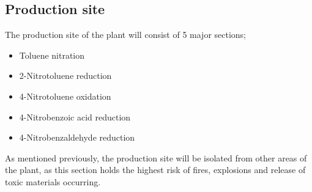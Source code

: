 \begin{comment}
Road traffic should not go through process areas except to destination. There should be loading and unloading areas with adequate parking. 

Emergency arrangements - emergency control centre. Assembley points designated in safe areas at least 100 metres from the plant. A control rooom not used as emergency centre room or refuge room. 
Road access to all points in the site. 
Safeguard utilities like electricity.

Security - boundary fence around the site and all entrances should have a gatehouse. The number of entrances should be minimised. 

No workplace should be more than 45 m from an exit. 

A wind of at least 8km/h needed needed to disperse toxic vapours safely.

Fire fighting access with plot size 100 x 200 m and spacing between plot and buildings of 15 m. 

A minimum of two escape routes for any workspace. No work place should be more than 12 to 45 m from an exit and dead end should not exceed 8 m. Doors on escape room should be hinged or sliding type and the hinged should open in the direction of escape. Should be at least 0.7m wide (preferably 1.2m). 
\end{comment}




\subsection{Production site}

The production site of the plant will consist of 5 major sections; 

\begin{itemize}
    \item Toluene nitration
    \item 2-Nitrotoluene reduction 
    \item 4-Nitrotoluene oxidation 
    \item 4-Nitrobenzoic acid reduction 
    \item 4-Nitrobenzaldehyde reduction 
\end{itemize}

As mentioned previously, the production site will be isolated from other areas of the plant, as this section holds the highest risk of fires, explosions  and release of toxic materials occurring. 

